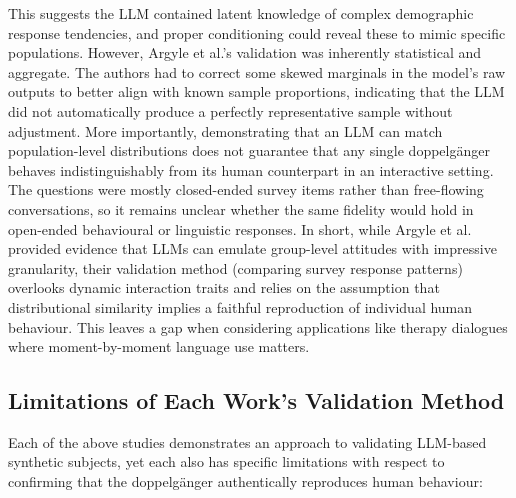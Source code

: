 This suggests the LLM contained latent knowledge of complex demographic response tendencies, and proper conditioning could reveal these to mimic specific populations. However, Argyle et al.’s validation was inherently statistical and aggregate. The authors had to correct some skewed marginals in the model’s raw outputs to better align with known sample proportions, indicating that the LLM did not automatically produce a perfectly representative sample without adjustment. More importantly, demonstrating that an LLM can match population-level distributions does not guarantee that any single doppelgänger behaves indistinguishably from its human counterpart in an interactive setting. The questions were mostly closed-ended survey items rather than free-flowing conversations, so it remains unclear whether the same fidelity would hold in open-ended behavioural or linguistic responses. In short, while Argyle et al. provided evidence that LLMs can emulate group-level attitudes with impressive granularity, their validation method (comparing survey response patterns) overlooks dynamic interaction traits and relies on the assumption that distributional similarity implies a faithful reproduction of individual human behaviour. This leaves a gap when considering applications like therapy dialogues where moment-by-moment language use matters.



\subsection{Limitations of Each Work's Validation Method}

Each of the above studies demonstrates an approach to validating LLM-based synthetic subjects, yet each also has specific limitations with respect to confirming that the doppelgänger authentically reproduces human behaviour:

